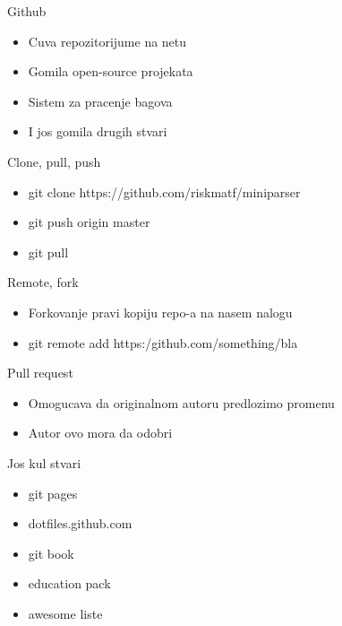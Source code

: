 \documentclass{beamer}
\begin{document}
	\begin{frame}{Github}
		\begin{itemize}
			\item Cuva repozitorijume na netu
			\item Gomila open-source projekata
			\item Sistem za pracenje bagova
			\item I jos gomila drugih stvari
		\end{itemize}
	\end{frame}
	
	\begin{frame}{Clone, pull, push}
		\begin{itemize}
			\item git clone https://github.com/riskmatf/miniparser
			\item git push origin master
			\item git pull
		\end{itemize}
	\end{frame}
	
	\begin{frame}{Remote, fork}
		\begin{itemize}
			\item Forkovanje pravi kopiju repo-a na nasem nalogu
			\item git remote add https:/github.com/something/bla
		\end{itemize}
	\end{frame}
	
	\begin{frame}{Pull request}
		\begin{itemize}
			\item Omogucava da originalnom autoru predlozimo promenu
			\item Autor ovo mora da odobri
		\end{itemize}
	\end{frame}
	
	\begin{frame}{Jos kul stvari}
		\begin{itemize}
			\item git pages
			\item dotfiles.github.com
			\item git book
			\item education pack
			\item awesome liste
		\end{itemize}
	\end{frame}
\end{document}
